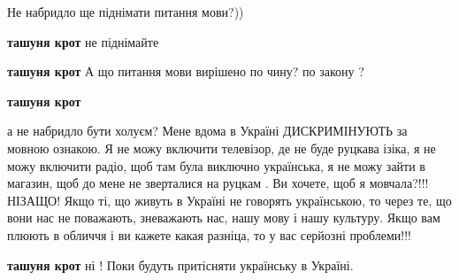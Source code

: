 \begin{itemize}
 
Не набридло ще піднімати питання мови?))

\begin{itemize}
 
\textbf{ташуня крот} не піднімайте

 
\textbf{ташуня крот} А що питання мови вирішено по чину? по закону ?

 
\textbf{ташуня крот} 

а не набридло бути холуєм? Мене вдома в Україні ДИСКРИМІНУЮТЬ за мовною
ознакою. Я не можу включити телевізор, де не буде руцкава ізіка, я не можу
включити радіо, щоб там була виключно українська, я не можу зайти в магазин,
щоб до мене не зверталися на руцкам . Ви хочете, щоб я мовчала?!!! НІЗАЩО! Якщо
ті, що живуть в Україні не говорять українською, то через те, що вони нас не
поважають, зневажають нас, нашу мову і нашу культуру. Якщо вам плюють в обличчя
і ви кажете какая разніца, то у вас серйозні проблеми!!!

 
\textbf{ташуня крот} ні ! Поки будуть притісняти українську в Україні.

\end{itemize}


\end{itemize}

